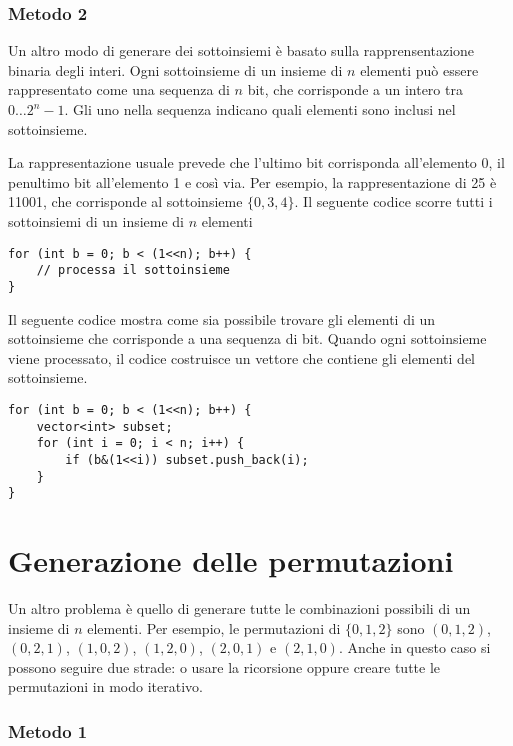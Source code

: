 \subsubsection{Metodo 2}

Un altro modo di generare dei sottoinsiemi è basato
sulla rapprensentazione binaria degli interi.
Ogni sottoinsieme di un insieme di $n$ elementi
può essere rappresentato come una sequenza di $n$ bit,
che corrisponde a un intero tra $0 \ldots 2^n-1$.
Gli uno nella sequenza indicano quali elementi
sono inclusi nel sottoinsieme.

La rappresentazione usuale prevede che l'ultimo bit corrisponda
all'elemento 0, il penultimo bit all'elemento 1 e così via.
Per esempio, la rappresentazione di 25 è 11001, che corrisponde al sottoinsieme
$\{0,3,4\}$.
Il seguente codice scorre tutti i sottoinsiemi di un 
insieme di $n$ elementi

\begin{lstlisting}
for (int b = 0; b < (1<<n); b++) {
    // processa il sottoinsieme
}
\end{lstlisting}

Il seguente codice mostra come sia possibile trovare gli
elementi di un sottoinsieme che corrisponde a una sequenza di bit.
Quando ogni sottoinsieme viene processato,
il codice costruisce un vettore che contiene gli
elementi del sottoinsieme.

\begin{lstlisting}
for (int b = 0; b < (1<<n); b++) {
    vector<int> subset;
    for (int i = 0; i < n; i++) {
        if (b&(1<<i)) subset.push_back(i);
    }
}
\end{lstlisting}

\section{Generazione delle permutazioni}


Un altro problema è quello di generare tutte le combinazioni possibili
di un insieme di $n$ elementi.
Per esempio, le permutazioni di $\{0,1,2\}$ sono
$(0,1,2)$, $(0,2,1)$, $(1,0,2)$, $(1,2,0)$,
$(2,0,1)$ e $(2,1,0)$.
Anche in questo caso si possono seguire due strade:
o usare la ricorsione oppure creare tutte le permutazioni in 
modo iterativo.

\subsubsection{Metodo 1}

